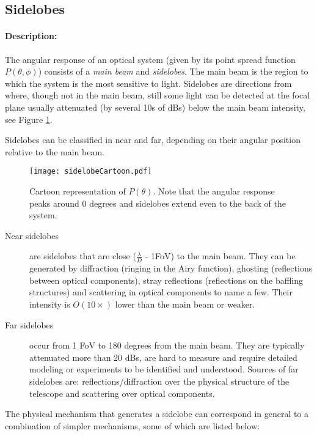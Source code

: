 \subsection{Sidelobes}

\paragraph{Description:}
The angular response of an optical system (given by its point spread function $P(\theta, \phi)$) consists of a \emph{main beam} and \emph{sidelobes}. The main beam is the region to which the system is the most sensitive to light. Sidelobes are directions from where, though not in the main beam, still some light can be detected at the focal plane usually attenuated (by several 10s of dBs) below the main beam intensity, see Figure \ref{fig:cartoonSidelobe}.

Sidelobes can be classified in near and far, depending on their angular position relative to the main beam.

\begin{figure}[h]
\label{fig:cartoonSidelobe}
\centering
\texttt{[image: sidelobeCartoon.pdf]}
\caption{Cartoon representation of $P(\theta)$. Note that the angular response peaks around 0 degrees and sidelobes extend even to the back of the system.}
\end{figure}


\begin{description}
\item[Near sidelobes] are sidelobes that are close ($\frac{\lambda}{D}$ - 1FoV) to the main beam. They can be generated by diffraction (ringing in the Airy function), ghosting (reflections between optical components), stray reflections (reflections on the baffling structures) and scattering in optical components to name a few. Their intensity is $O(10\times)$ lower than the main beam or weaker.

\item[Far sidelobes] occur from 1 FoV to 180 degrees from the main beam. They are typically attenuated more than 20 dBs, are hard to measure and require detailed modeling or experiments to be identified and understood. Sources of far sidelobes are: reflections/diffraction over the physical structure of the telescope and scattering over optical components. 
\end{description}

The physical mechanism that generates a sidelobe can correspond in general to a combination of simpler mechanisms, some of which are listed below: 

